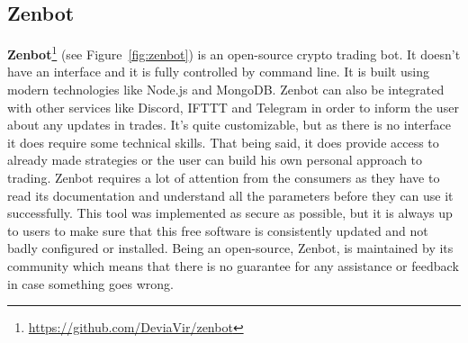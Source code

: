 \documentclass[12pt,a4paper]{report}
\begin{document}
\subsection{Zenbot}
\textbf{Zenbot}\footnote{\url{https://github.com/DeviaVir/zenbot}} (see Figure~\ref{fig:zenbot}) is an open-source crypto trading bot. It doesn't have an interface and it is fully controlled by command line. It is built using modern technologies like Node.js and MongoDB. Zenbot can also be integrated with other services like Discord, IFTTT and Telegram in order to inform the user about any updates in trades. It's quite customizable, but as there is no interface it does require some technical skills. That being said, it does provide access to already made strategies or the user can build his own personal approach to trading. Zenbot requires a lot of attention from the consumers as they have to read its documentation and understand all the parameters before they can use it successfully. This tool was implemented as secure as possible, but it is always up to users to make sure that this free software is consistently updated and not badly configured or installed. Being an open-source, Zenbot, is maintained by its community which means that there is no guarantee for any assistance or feedback in case something goes wrong. 
\end{document}
